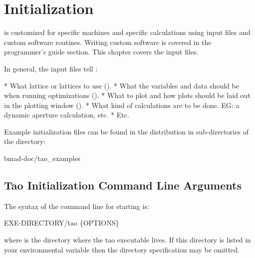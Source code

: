 \chapter{Initialization}
\label{c:init}

\tao is customized for specific machines and specific calculations using input files and custom
software routines. Writing custom software is covered in the programmer's guide section. This
chapter covers the input files.

In general, the input files tell \tao:
\begin{example}
  * What \bmad lattice or lattices to use ().
  * What the variables and data should be when running optimizations ().
  * What to plot and how plots should be laid out in the plotting window ().
  * What kind of calculations are to be done. EG: a dynamic aperture calculation, etc.
  * Etc.
\end{example}

Example initialization files can be found in the \tao distribution in sub-directories of the
directory:
\begin{example}
  bmad-doc/tao_examples
\end{example}

\section{Tao Initialization Command Line Arguments}
\label{s:command.line} 

The syntax of the command line for starting \tao is:
\begin{example}
  EXE-DIRECTORY/tao \{OPTIONS\}
\end{example}
where  is the directory where the tao executable lives. If this directory is
listed in your  environmental variable then the directory specification may be omitted.

